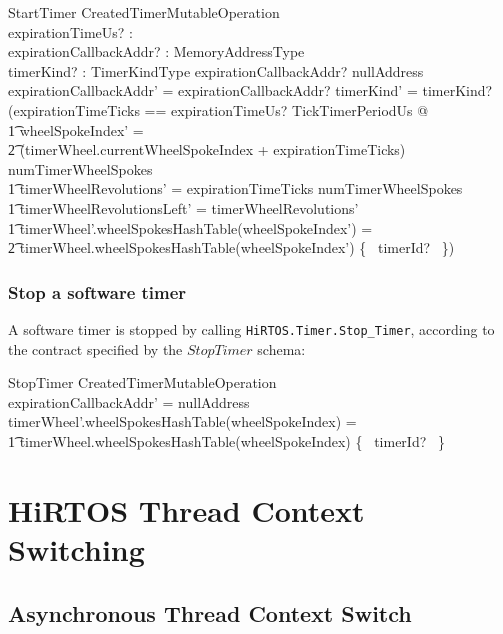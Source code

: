 \documentclass[11pt,letterpaper,twoside,openany]{book}
\begin{document}
\begin{schema}{StartTimer}
   CreatedTimerMutableOperation \\
   expirationTimeUs? : \nat \\
   expirationCallbackAddr? : MemoryAddressType \\
   timerKind? : TimerKindType
\where
   expirationCallbackAddr? \neq nullAddress
\also
   expirationCallbackAddr' = expirationCallbackAddr?
\also
   timerKind' = timerKind?
\also
   (\LET expirationTimeTicks == expirationTimeUs? \div TickTimerPeriodUs @ \\
      \t1 wheelSpokeIndex' = \\
      \t2 (timerWheel.currentWheelSpokeIndex + expirationTimeTicks) \mod numTimerWheelSpokes \land \\
      \t1 timerWheelRevolutions' = expirationTimeTicks \div numTimerWheelSpokes \land \\
      \t1 timerWheelRevolutionsLeft' = timerWheelRevolutions' \land \\
      \t1 timerWheel'.wheelSpokesHashTable(wheelSpokeIndex') = \\
      \t2    timerWheel.wheelSpokesHashTable(wheelSpokeIndex') \cup \{~ timerId? ~\})
\end{schema}

\subsubsection{Stop a software timer}

A software timer is stopped by calling \verb`HiRTOS.Timer.Stop_Timer`, according to the contract
specified by the $StopTimer$ schema:

\begin{schema}{StopTimer}
   CreatedTimerMutableOperation \\
\where
   expirationCallbackAddr' = nullAddress
\also
   timerWheel'.wheelSpokesHashTable(wheelSpokeIndex) = \\
   \t1  timerWheel.wheelSpokesHashTable(wheelSpokeIndex) \setminus \{~ timerId? ~\}
\end{schema}

\section{HiRTOS Thread Context Switching}

\subsection{Asynchronous Thread Context Switch}
\end{document}

